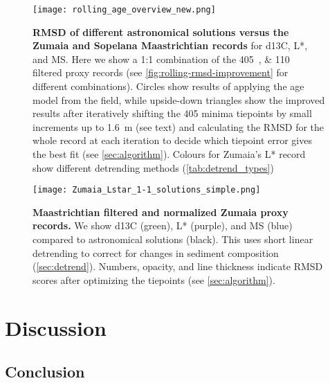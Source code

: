 \documentclass[draft]{agujournal2019}
\begin{document}
\begin{figure}[htb]
  \centering
  \texttt{[image: rolling\_age\_overview\_new.png]}
  \caption{\label{fig:rolling-rmsd}
  \textbf{\gls{RMSD} of different astronomical solutions versus the Zumaia and Sopelana Maastrichtian records} for \gls{d13C}, \gls{L*}, and \gls{MS}.
  Here we show a 1:1 combination of the \qtylist{405;110}{\kiloyear} filtered proxy records (see \cref{fig:rolling-rmsd-improvement} for different combinations).
  Circles show results of applying the age model from the field, while upside-down     triangles show the improved results after iteratively shifting the \qty{405}{\kiloyear} minima tiepoints by small increments up to \textpm\qty{1.6}{\metre} (see text) and calculating the \gls{RMSD} for the whole record at each iteration to decide which tiepoint error gives the best fit (see \cref{sec:algorithm}).
  Colours for Zumaia's \gls{L*} record show different detrending methods (\cref{tab:detrend_types})}
\end{figure}


\begin{figure}[htb]
  \centering
  \texttt{[image: Zumaia\_Lstar\_1-1\_solutions\_simple.png]}
  \caption{\label{fig:rolling-age}
  \textbf{Maastrichtian filtered and normalized Zumaia proxy records.}
  We show \gls{d13C} (green), \gls{L*} (purple), and \gls{MS} (blue) compared to astronomical solutions (black).
  This uses short linear detrending to correct for changes in sediment composition (\cref{sec:detrend}).
  Numbers, opacity, and line thickness indicate \gls{RMSD} scores after optimizing the tiepoints (see \cref{sec:algorithm}).}
\end{figure}


\section{Discussion}\label{sec:discussion}




\subsection{Conclusion}\label{sec:conclusion}




\end{document}
